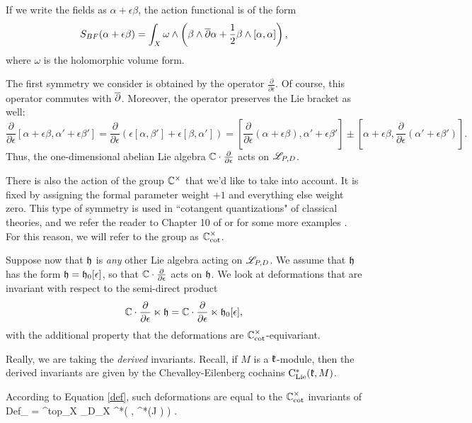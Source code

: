 \documentclass[11pt]{amsart}
\begin{document}
If we write the fields as $\alpha + \epsilon \beta$, the action functional is of the form
\[
S_{BF} (\alpha + \epsilon \beta) = \int_X \omega \wedge \left(\beta \wedge \overline{\partial} \alpha + \frac{1}{2} \beta \wedge [\alpha,\alpha]\right) ,
\] 
where $\omega$ is the holomorphic volume form. 

The first symmetry we consider is obtained by the operator $\frac{\partial}{\partial \epsilon}$. 
Of course, this operator commutes with $\overline{\partial}$. 
Moreover, the operator preserves the Lie bracket as well:
\[
\frac{\partial}{\partial \epsilon} [\alpha + \epsilon \beta, \alpha' + \epsilon \beta'] = \frac{\partial}{\partial \epsilon} \left(\epsilon [\alpha, \beta'] + \epsilon[\beta, \alpha']\right) = [\frac{\partial}{\partial \epsilon} (\alpha + \epsilon \beta), \alpha' + \epsilon \beta'] \pm [\alpha + \epsilon \beta, \frac{\partial}{\partial \epsilon} (\alpha' + \epsilon \beta')] .
\]
Thus, the one-dimensional abelian Lie algebra $\mathbb C \cdot \frac{\partial}{\partial \epsilon}$ acts on $\mathscr L_{P,D}$. 

There is also the action of the group $\mathbb C^\times$ that we'd like to take into account.
It is fixed by assigning the formal parameter weight $+1$ and everything else weight zero. 
This type of symmetry is used in ``cotangent quantizations" of classical theories, and we refer the reader to Chapter 10 of \cite{CG2} or for some more examples \cite{wg2, GGW, GG1}.
For this reason, we will refer to the group as $\mathbb C^{\times}_{\rm cot}$.  

Suppose now that $\mathfrak h$ is {\em any} other Lie algebra acting on $\mathscr L_{P,D}$. 
We assume that $\mathfrak h$ has the form $\mathfrak h = \mathfrak h_0 [\epsilon]$, so that $\mathbb C \cdot \frac{\partial}{\partial \epsilon}$ acts on $\mathfrak h$. 
We look at deformations that are invariant with respect to the semi-direct product
\[
\mathbb C \cdot \frac{\partial}{\partial \epsilon} \ltimes \mathfrak h = \mathbb C \cdot \frac{\partial}{\partial \epsilon} \ltimes \mathfrak h_0 [\epsilon] ,
\]
with the additional property that the deformations are $\mathbb C^\times_{\rm cot}$-equivariant. 

\begin{rmk}
Really, we are taking the {\em derived} invariants.
Recall, if $M$ is a $\mathfrak{k}$-module, then the derived invariants are given by the Chevalley-Eilenberg cochains ${\rm C}_{{\rm Lie}}^*(\mathfrak{k}, M)$. 
\end{rmk}

According to Equation \ref{def}, such deformations are equal to the $\mathbb C^\times_{\rm cot}$ invariants of
\beqn\label{def bf}
{\rm Def}_{\sL} = \Omega^{top}_X \tensor_{D_X} \clie^*\left(\CC \cdot \frac{\partial}{\partial \epsilon} \ltimes \fh, \cred^*(J \sL) \right) .
\eeqn
\end{document}
